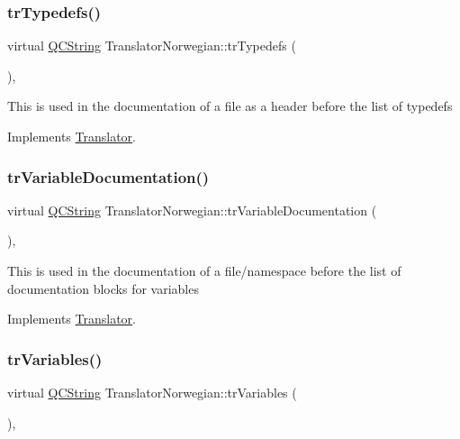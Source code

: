 \subsubsection{\texorpdfstring{trTypedefs()}{trTypedefs()}}
{\footnotesize\ttfamily virtual \mbox{\hyperlink{class_q_c_string}{Q\+C\+String}} Translator\+Norwegian\+::tr\+Typedefs (\begin{DoxyParamCaption}{ }\end{DoxyParamCaption})\hspace{0.3cm}{\ttfamily [inline]}, {\ttfamily [virtual]}}

This is used in the documentation of a file as a header before the list of typedefs 

Implements \mbox{\hyperlink{class_translator}{Translator}}.

\mbox{\label{class_translator_norwegian_a79c01604daaf2eb75f6a53d45abfed9e}} 
\subsubsection{\texorpdfstring{trVariableDocumentation()}{trVariableDocumentation()}}
{\footnotesize\ttfamily virtual \mbox{\hyperlink{class_q_c_string}{Q\+C\+String}} Translator\+Norwegian\+::tr\+Variable\+Documentation (\begin{DoxyParamCaption}{ }\end{DoxyParamCaption})\hspace{0.3cm}{\ttfamily [inline]}, {\ttfamily [virtual]}}

This is used in the documentation of a file/namespace before the list of documentation blocks for variables 

Implements \mbox{\hyperlink{class_translator}{Translator}}.

\mbox{\label{class_translator_norwegian_a4ff9a3e4beb96de99947fff437bf5030}} 
\subsubsection{\texorpdfstring{trVariables()}{trVariables()}}
{\footnotesize\ttfamily virtual \mbox{\hyperlink{class_q_c_string}{Q\+C\+String}} Translator\+Norwegian\+::tr\+Variables (\begin{DoxyParamCaption}{ }\end{DoxyParamCaption})\hspace{0.3cm}{\ttfamily [inline]}, {\ttfamily [virtual]}}


